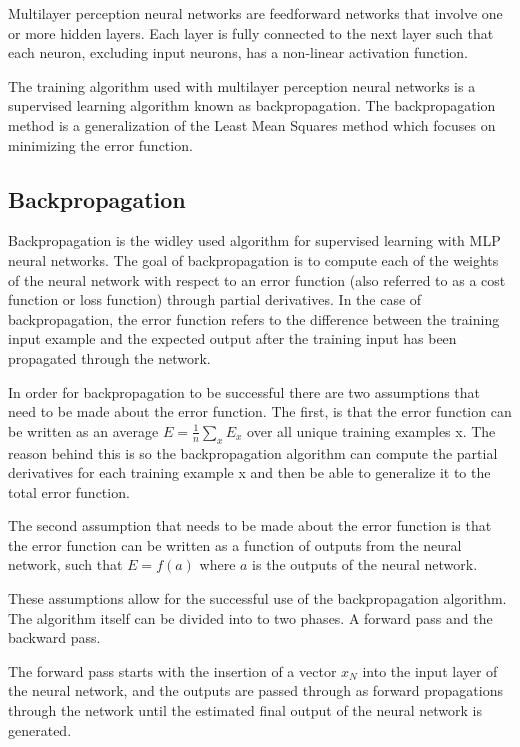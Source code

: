 Multilayer perception neural networks are feedforward networks that involve one or more hidden layers. Each layer is fully connected to the next layer such that each neuron, excluding input neurons, has a non-linear activation function.

The training algorithm used with multilayer perception neural networks is a supervised learning algorithm known as backpropagation. The backpropagation method is a generalization of the Least Mean Squares method which focuses on minimizing the error function. \cite{kar}


\subsection{Backpropagation}\label{sec:cap-num}
Backpropagation is the widley used algorithm for supervised learning with MLP neural networks. The goal of backpropagation is to compute each of the weights of the neural network with respect to an error function (also referred to as a cost function or loss function) through partial derivatives. In the case of backpropagation, the error function refers to the difference between the training input example and the expected output after the training input has been propagated through the network. \cite{nielsen_1970}

In order for backpropagation to be successful there are two assumptions that need to be made about the error function. The first, is that the error function can be written as an average $ E = \frac{1}{n}\sum_{x} E_x$ over all unique training examples x. The reason behind this is so the backpropagation algorithm can compute the partial derivatives for each training example x and then be able to generalize it to the total error function. \cite{nielsen_1970}

The second assumption that needs to be made about the error function is that the error function can be written as a function of outputs from the neural network, such that $E = f(a)$ where $a$ is the outputs of the neural network. \cite{nielsen_1970}

These assumptions allow for the successful use of the backpropagation algorithm. The algorithm itself can be divided into to two phases. A forward pass and the backward pass. 

The forward pass starts with the insertion of a vector $x_N$ into the input layer of the neural network, and the outputs are passed through as forward propagations through the network until the estimated final output of the neural network is generated. \cite{nielsen_1970}

